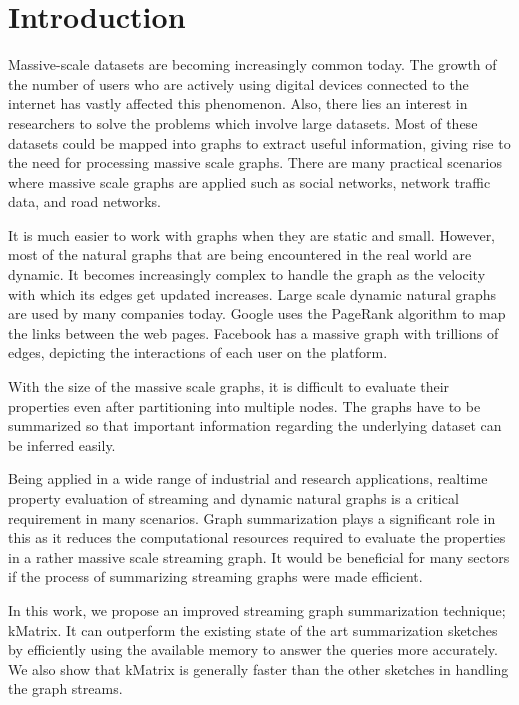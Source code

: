 \section{Introduction}

Massive-scale datasets are becoming increasingly common today. The growth of the number of users who are actively using digital devices connected to the internet has vastly affected this phenomenon. Also, there lies an interest in researchers to solve the problems which involve large datasets. Most of these datasets could be mapped into graphs to extract useful information, giving rise to the need for processing massive scale graphs. There are many practical scenarios where massive scale graphs are applied such as social networks, network traffic data, and road networks.

It is much easier to work with graphs when they are static and small. However, most of the natural graphs that are being encountered in the real world are dynamic. It becomes increasingly complex to handle the graph as the velocity with which its edges get updated increases. Large scale dynamic natural graphs are used by many companies today. Google uses the PageRank algorithm\cite{brin_anatomy_1998, page_pagerank_nodate} to map the links between the web pages. Facebook has a massive graph with trillions of edges\cite{ching_one_2015}, depicting the interactions of each user on the platform.

With the size of the massive scale graphs, it is difficult to evaluate their properties even after partitioning into multiple nodes. The graphs have to be summarized so that important information regarding the underlying dataset can be inferred easily.

Being applied in a wide range of industrial and research applications, realtime property evaluation of streaming and dynamic natural graphs is a critical requirement in many scenarios. Graph summarization plays a significant role in this as it reduces the computational resources required to evaluate the properties in a rather massive scale streaming graph. It would be beneficial for many sectors if the process of summarizing streaming graphs were made efficient.

In this work, we propose an improved streaming graph summarization technique; kMatrix. It can outperform the existing state of the art summarization sketches by efficiently using the available memory to answer the queries more accurately. We also show that kMatrix is generally faster than the other sketches in handling the graph streams.